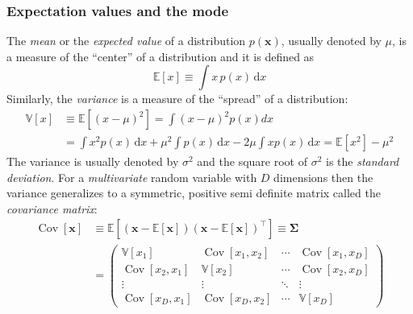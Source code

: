 \documentclass[12pt,dvipsnames]{report}
\newcommand{\ud}{\,\mathrm{d}}
\renewcommand{\vec}[1]{\boldsymbol{\mathbf{#1}}}
\begin{document}
\subsubsection{Expectation values and the mode}
The \emph{mean} or the \emph{expected value} of a distribution $p(\vec{x})$,
usually denoted by $\mu$, is a measure of the ``center'' of a distribution and
it is defined as
\begin{equation}
    \mathbb{E}[x] \equiv\int x \,p(x) \ud x
\end{equation}
Similarly, the \emph{variance} is a measure of the ``spread'' of a distribution:
\begin{align}
    \mathbb{V}[x] & \equiv\mathbb{E}\left[(x-\mu)^{2}\right]=\int(x-\mu)^{2} p(x) d x                                           \\
                  & =\int x^{2} p(x) \ud x+\mu^{2} \int p(x) \ud x-2 \mu \int x p(x) \ud x=\mathbb{E}\left[x^{2}\right]-\mu^{2}
\end{align}
The variance is usually denoted by $\sigma^2$ and the square root of $\sigma^2$ is the
\emph{standard deviation}.
For a \emph{multivariate} random variable with $D$ dimensions then the variance generalizes to
a symmetric, positive semi definite matrix called the \emph{covariance matrix}:
\begin{align}
    \operatorname{Cov}[\vec{x}] & \equiv\mathbb{E}\left[(\vec{x}-\mathbb{E}[\vec{x}])(\vec{x}-\mathbb{E}[\vec{x}])^{\intercal}\right] \equiv \boldsymbol{\Sigma}                                                                                                                                                                           \\
                                & =\left(\begin{array}{cccc}
                                             \mathbb{V}\left[x_{1}\right]                & \operatorname{Cov}\left[x_{1}, x_{2}\right] & \cdots & \operatorname{Cov}\left[x_{1}, x_{D}\right] \\
                                             \operatorname{Cov}\left[x_{2}, x_{1}\right] & \mathbb{V}\left[x_{2}\right]                & \cdots & \operatorname{Cov}\left[x_{2}, x_{D}\right] \\
                                             \vdots                                      & \vdots                                      & \ddots & \vdots                                      \\
                                             \operatorname{Cov}\left[x_{D}, x_{1}\right] & \operatorname{Cov}\left[x_{D}, x_{2}\right] & \cdots & \mathbb{V}\left[x_{D}\right]
                                         \end{array}\right)
\end{align}
\end{document}
